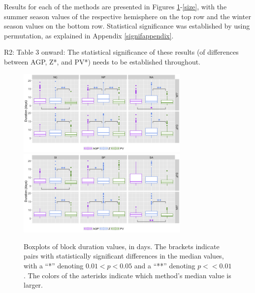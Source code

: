 \documentclass[smallextended]{svjour3}       %
\numberwithin{equation}{section}
\begin{document}
{\color{blue}Results for each of the methods are presented in Figures \ref{duration}-\ref{size}, with the summer season values of the respective hemisphere on the top row and the winter season values on the bottom row. Statistical significance was established by using permutation, as explained in Appendix \ref{signifappendix}.}

{\color{teal} R2: Table 3 onward: The statistical significance of these results (of differences between AGP, Z*, and PV*) needs to be established throughout.}



\begin{figure}
    \centering
    \includegraphics[width=0.75\textwidth]{fig_duration_NH.png}
    \includegraphics[width=0.75\textwidth]{fig_duration_SH.png}
    \caption{Boxplots of block duration values, in days. The brackets indicate pairs with statistically significant differences in the median values, with a ``*'' denoting $0.01<p<0.05$ and a ``**'' denoting $p<<0.01$. The colors of the asterisks indicate which method's median value is larger.}
    \label{duration}
\end{figure}
\end{document}
